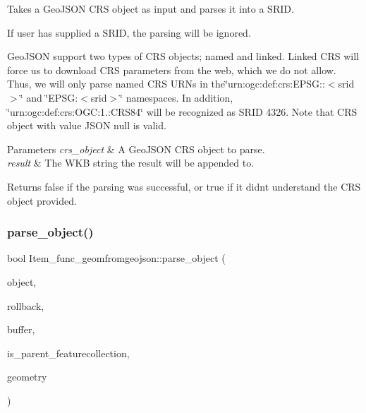 Takes a Geo\+J\+S\+ON C\+RS object as input and parses it into a S\+R\+ID.

If user has supplied a S\+R\+ID, the parsing will be ignored.

Geo\+J\+S\+ON support two types of C\+RS objects; named and linked. Linked C\+RS will force us to download C\+RS parameters from the web, which we do not allow. Thus, we will only parse named C\+RS U\+R\+Ns in the\char`\"{}urn\+:ogc\+:def\+:crs\+:\+E\+P\+S\+G\+::$<$srid$>$\char`\"{} and \char`\"{}\+E\+P\+S\+G\+:$<$srid$>$\char`\"{} namespaces. In addition, \char`\"{}urn\+:ogc\+:def\+:crs\+:\+O\+G\+C\+:1.\+:\+C\+R\+S84\char`\"{} will be recognized as S\+R\+ID 4326. Note that C\+RS object with value J\+S\+ON null is valid.


\begin{DoxyParams}{Parameters}
{\em crs\+\_\+object} & A Geo\+J\+S\+ON C\+RS object to parse. \\
\hline
{\em result} & The W\+KB string the result will be appended to.\\
\hline
\end{DoxyParams}
\begin{DoxyReturn}{Returns}
false if the parsing was successful, or true if it didn\textquotesingle{}t understand the C\+RS object provided. 
\end{DoxyReturn}
\mbox{\label{classItem__func__geomfromgeojson_a1a316ec406d1b5680851c727685f7d17}} 
\subsubsection{\texorpdfstring{parse\+\_\+object()}{parse\_object()}}
{\footnotesize\ttfamily bool Item\+\_\+func\+\_\+geomfromgeojson\+::parse\+\_\+object (\begin{DoxyParamCaption}\item[{const \mbox{\hyperlink{classJson__object}{Json\+\_\+object}} $\ast$}]{object,  }\item[{bool $\ast$}]{rollback,  }\item[{String $\ast$}]{buffer,  }\item[{bool}]{is\+\_\+parent\+\_\+featurecollection,  }\item[{\mbox{\hyperlink{classGeometry}{Geometry}} $\ast$$\ast$}]{geometry }\end{DoxyParamCaption})}

